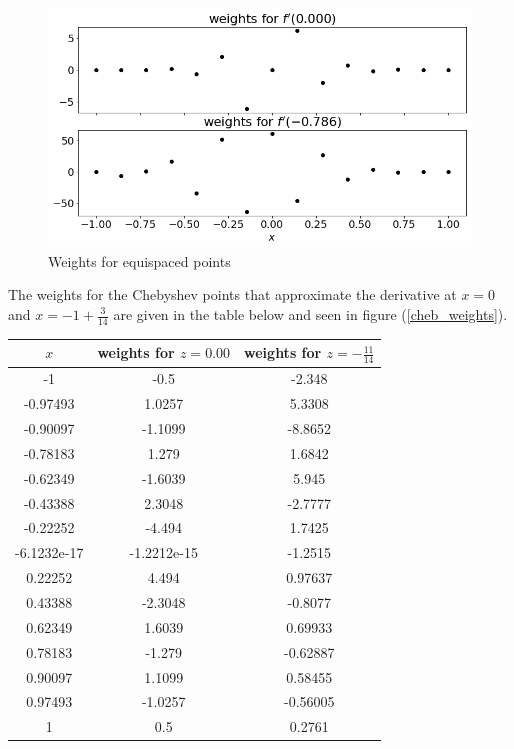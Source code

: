 \documentclass[12pt]{article}
\begin{document}
\begin{figure}[H]
	\caption{Weights for equispaced points}
	\label{equ_weights}
	\includegraphics[width=.9\textwidth]{hw1_p4b_equi_weights}
	\centering
\end{figure}

The weights for the Chebyshev points that approximate the derivative at $x=0$ and $x=-1+\tfrac{3}{14}$ are given in the table below and seen in figure (\ref{cheb_weights}). 
\begin{center}
	\begin{tabular}{|c|c|c|}
		\hline
		$x$&weights for $z=0.00$&weights for $z=-\tfrac{11}{14}$\\ \hline
		-1&-0.5&-2.348\\ \hline
		-0.97493&1.0257&5.3308\\ \hline
		-0.90097&-1.1099&-8.8652\\ \hline
		-0.78183&1.279&1.6842\\ \hline
		-0.62349&-1.6039&5.945\\ \hline
		-0.43388&2.3048&-2.7777\\ \hline
		-0.22252&-4.494&1.7425\\ \hline
		-6.1232e-17&-1.2212e-15&-1.2515\\ \hline
		0.22252&4.494&0.97637\\ \hline
		0.43388&-2.3048&-0.8077\\ \hline
		0.62349&1.6039&0.69933\\ \hline
		0.78183&-1.279&-0.62887\\ \hline
		0.90097&1.1099&0.58455\\ \hline
		0.97493&-1.0257&-0.56005\\ \hline
		1&0.5&0.2761\\ \hline
	\end{tabular}
\end{center}
\end{document}
